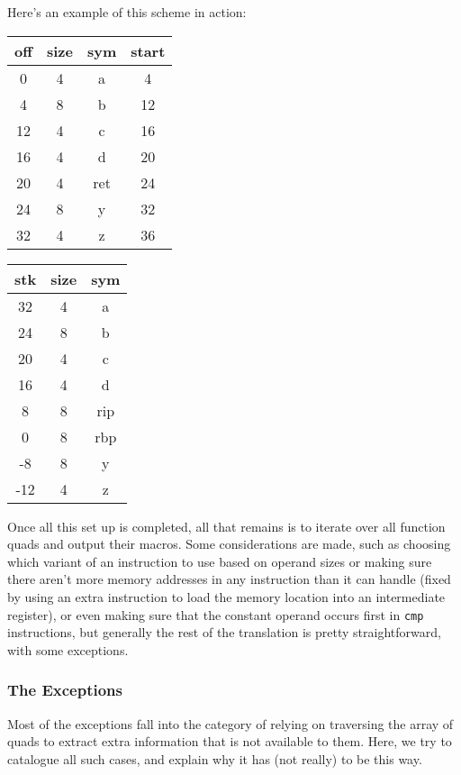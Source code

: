 \documentclass{article}
\begin{document}
{{		Here's an example of this scheme in action:
		\begin{center}
			\begin{tabular}{c|c|c|c}
				\textbf{off} & \textbf{size} & \textbf{sym} & \textbf{start}\\
				\hline
				0 & 4 & a & 4\\
				4 & 8 & b & 12\\
				12 & 4 & c & 16\\
				16 & 4 & d & 20\\
				20 & 4 & ret & 24\\
				24 & 8 & y & 32\\
				32 & 4 & z & 36
			\end{tabular}
			\hspace*{40px}
			\begin{tabular}{c|c|c}
				\textbf{stk} & \textbf{size} & \textbf{sym}\\
				\hline
				32 & 4 & a\\
				24 & 8 & b\\
				20 & 4 & c\\
				16 & 4 & d\\
				8 & 8 & rip\\
				0 & 8 & rbp\\
				-8 & 8 & y\\
				-12 & 4 & z
			\end{tabular}
		\end{center}

		Once all this set up is completed, all that remains is to iterate over all function quads and output their macros. Some considerations are made, such as choosing which variant of an instruction to use based on operand sizes or making sure there aren't more memory addresses in any instruction than it can handle (fixed by using an extra instruction to load the memory location into an intermediate register), or even making sure that the constant operand occurs first in \verb|cmp| instructions, but generally the rest of the translation is pretty straightforward, with some exceptions.
	}
	\subsubsection{The Exceptions}{
		Most of the exceptions fall into the category of relying on traversing the array of quads to extract extra information that is not available to them. Here, we try to catalogue all such cases, and explain why it has (not really) to be this way.

}}
\end{document}

